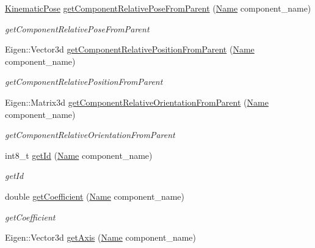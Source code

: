 \begin{DoxyCompactItemize}
\hyperlink{structrobotis__manipulator_1_1_kinematic_pose}{Kinematic\+Pose} \hyperlink{classrobotis__manipulator_1_1_manipulator_a2abc1041fd276bedc98c3a4e4fe4a452}{get\+Component\+Relative\+Pose\+From\+Parent} (\hyperlink{namespacerobotis__manipulator_a08c2d25e77a01ad75b9bb740f8ce4765}{Name} component\+\_\+name)
\begin{DoxyCompactList}\small\item\em get\+Component\+Relative\+Pose\+From\+Parent \end{DoxyCompactList}\item 
Eigen\+::\+Vector3d \hyperlink{classrobotis__manipulator_1_1_manipulator_aa910d1dae2cd9e44be612be1c45d9972}{get\+Component\+Relative\+Position\+From\+Parent} (\hyperlink{namespacerobotis__manipulator_a08c2d25e77a01ad75b9bb740f8ce4765}{Name} component\+\_\+name)
\begin{DoxyCompactList}\small\item\em get\+Component\+Relative\+Position\+From\+Parent \end{DoxyCompactList}\item 
Eigen\+::\+Matrix3d \hyperlink{classrobotis__manipulator_1_1_manipulator_a853cca36072acd6285a51f1df06b68bb}{get\+Component\+Relative\+Orientation\+From\+Parent} (\hyperlink{namespacerobotis__manipulator_a08c2d25e77a01ad75b9bb740f8ce4765}{Name} component\+\_\+name)
\begin{DoxyCompactList}\small\item\em get\+Component\+Relative\+Orientation\+From\+Parent \end{DoxyCompactList}\item 
int8\+\_\+t \hyperlink{classrobotis__manipulator_1_1_manipulator_a60db34ef6a62e0b15aa36f9b1571640d}{get\+Id} (\hyperlink{namespacerobotis__manipulator_a08c2d25e77a01ad75b9bb740f8ce4765}{Name} component\+\_\+name)
\begin{DoxyCompactList}\small\item\em get\+Id \end{DoxyCompactList}\item 
double \hyperlink{classrobotis__manipulator_1_1_manipulator_a437ac5f137aa788c4db07690c185e9ba}{get\+Coefficient} (\hyperlink{namespacerobotis__manipulator_a08c2d25e77a01ad75b9bb740f8ce4765}{Name} component\+\_\+name)
\begin{DoxyCompactList}\small\item\em get\+Coefficient \end{DoxyCompactList}\item 
Eigen\+::\+Vector3d \hyperlink{classrobotis__manipulator_1_1_manipulator_a87ccf9e102541d37ef93f3952a1d2ac9}{get\+Axis} (\hyperlink{namespacerobotis__manipulator_a08c2d25e77a01ad75b9bb740f8ce4765}{Name} component\+\_\+name)

\end{DoxyCompactItemize}
